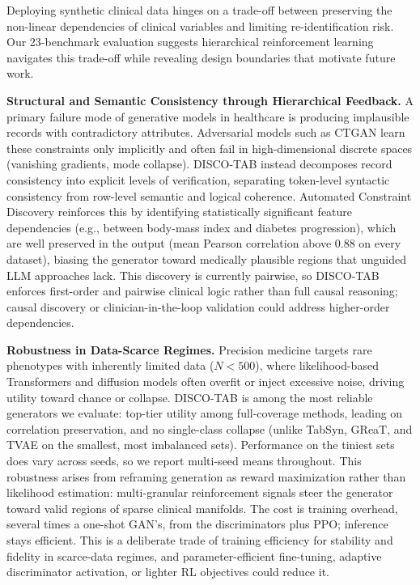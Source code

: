 

Deploying synthetic clinical data hinges on a trade-off between preserving the non-linear dependencies of clinical variables and limiting re-identification risk. Our 23-benchmark evaluation suggests hierarchical reinforcement learning navigates this trade-off while revealing design boundaries that motivate future work.

\textbf{Structural and Semantic Consistency through Hierarchical Feedback.}
A primary failure mode of generative models in healthcare is producing implausible records with contradictory attributes. Adversarial models such as CTGAN learn these constraints only implicitly and often fail in high-dimensional discrete spaces (vanishing gradients, mode collapse). DISCO-TAB instead decomposes record consistency into explicit levels of verification, separating token-level syntactic consistency from row-level semantic and logical coherence. Automated Constraint Discovery reinforces this by identifying statistically significant feature dependencies (e.g., between body-mass index and diabetes progression), which are well preserved in the output (mean Pearson correlation above $0.88$ on every dataset), biasing the generator toward medically plausible regions that unguided LLM approaches lack. This discovery is currently pairwise, so DISCO-TAB enforces first-order and pairwise clinical logic rather than full causal reasoning; causal discovery or clinician-in-the-loop validation could address higher-order dependencies.

\textbf{Robustness in Data-Scarce Regimes.}
Precision medicine targets rare phenotypes with inherently limited data ($N<500$), where likelihood-based Transformers and diffusion models often overfit or inject excessive noise, driving utility toward chance or collapse. DISCO-TAB is among the most reliable generators we evaluate: top-tier utility among full-coverage methods, leading on correlation preservation, and no single-class collapse (unlike TabSyn, GReaT, and TVAE on the smallest, most imbalanced sets). Performance on the tiniest sets does vary across seeds, so we report multi-seed means throughout. This robustness arises from reframing generation as reward maximization rather than likelihood estimation: multi-granular reinforcement signals steer the generator toward valid regions of sparse clinical manifolds. The cost is training overhead, several times a one-shot GAN's, from the discriminators plus PPO; inference stays efficient. This is a deliberate trade of training efficiency for stability and fidelity in scarce-data regimes, and parameter-efficient fine-tuning, adaptive discriminator activation, or lighter RL objectives could reduce it.

